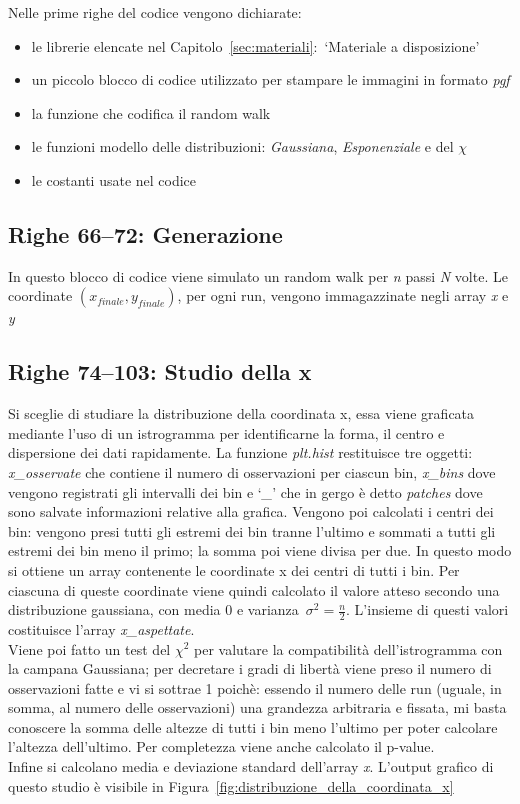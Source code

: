 \documentclass[a4paper,12pt]{article}
\begin{document}
Nelle prime righe del codice vengono dichiarate:

\begin{itemize}
    \item le librerie elencate nel Capitolo~\ref{sec:materiali}:~`Materiale a disposizione'
    \item un piccolo blocco di codice utilizzato per stampare le immagini in formato \textit{pgf}
    \item la funzione che codifica il random walk
    \item le funzioni modello delle distribuzioni: \textit{Gaussiana}, \textit{Esponenziale} e del $\chi$
    \item le costanti usate nel codice
\end{itemize}

\subsection{Righe 66--72: Generazione}

In questo blocco di codice viene simulato un random walk per \textit{n} passi \textit{N} volte. Le coordinate $(x_{finale}, y_{finale})$, per ogni run, vengono immagazzinate negli array \textit{x} e \textit{y}

\subsection{Righe 74--103: Studio della x}

Si sceglie di studiare la distribuzione della coordinata x, essa viene graficata mediante l'uso di un istrogramma per identificarne la forma, il centro e dispersione dei dati rapidamente.
La funzione \textit{plt.hist} restituisce tre oggetti: \textit{x\_osservate} che contiene il numero di osservazioni per ciascun bin, \textit{x\_bins} dove vengono registrati gli intervalli dei bin e `\textit{\_}' che in gergo è detto \textit{patches} dove sono salvate informazioni relative alla grafica.
Vengono poi calcolati i centri dei bin: vengono presi tutti gli estremi dei bin tranne l'ultimo e sommati a tutti gli estremi dei bin meno il primo; la somma poi viene divisa per due. In questo modo si ottiene un array contenente le coordinate x dei centri di tutti i bin.
Per ciascuna di queste coordinate viene quindi calcolato il valore atteso secondo una distribuzione gaussiana, con media 0 e varianza~$\sigma^2 = \frac{n}{2}$. L’insieme di questi valori costituisce l’array \textit{x\_aspettate}.\\
Viene poi fatto un test del $\chi^2$ per valutare la compatibilità dell'istrogramma con la campana Gaussiana; per decretare i gradi di libertà viene preso il numero di osservazioni fatte e vi si sottrae 1 poichè: essendo il numero delle run (uguale, in somma, al numero delle osservazioni) una grandezza arbitraria e fissata, mi basta conoscere la somma delle altezze di tutti i bin meno l'ultimo per poter calcolare l'altezza dell'ultimo.
Per completezza viene anche calcolato il p-value.\\
Infine si calcolano media e deviazione standard dell'array \textit{x}. L'output grafico di questo studio è visibile in Figura~\ref{fig:distribuzione_della_coordinata_x}
\end{document}
